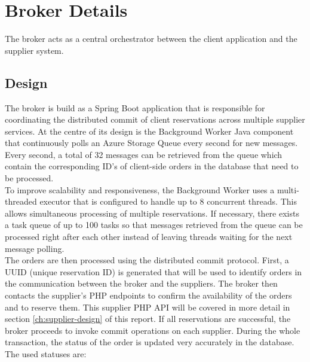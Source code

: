 \documentclass[10pt,a4paper,kul]{kulakarticle} %
\begin{document}
	\section{Broker Details}
		The broker acts as a central orchestrator between the client application and the supplier system. 
		\subsection{Design}
		The broker is build as a Spring Boot application that is responsible for coordinating the distributed commit of client reservations across multiple supplier services. At the centre of its design is the Background Worker Java component that continuously polls an Azure Storage Queue every second for new messages. Every second, a total of 32 messages can be retrieved from the queue which  contain the corresponding ID's of client-side orders in the database that need to be processed.\\
		\newline
		To improve scalability and responsiveness, the Background Worker uses a multi-threaded executor that is configured to handle up to 8 concurrent threads. This allows simultaneous processing of multiple reservations. If necessary, there exists a task queue of up to 100 tasks so that messages retrieved from the queue can be processed right after each other instead of leaving threads waiting for the next message polling.\\
		\newline
		The orders are then processed using the distributed commit protocol. First, a UUID (unique reservation ID) is generated that will be used to identify orders in the communication between the broker and the suppliers. The broker then contacts the supplier's PHP endpoints to confirm the availability of the orders and to reserve them. This supplier PHP API will be covered in more detail in section \ref{ch:supplier-design} of this report. If all reservations are successful, the broker proceeds to invoke commit operations on each supplier. During the whole transaction, the status of the order is updated very accurately in the database. The used statuses are:
		
\end{document}
